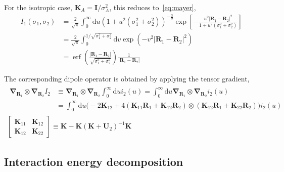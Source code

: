 For the isotropic case, $\mathbf K_A=\mathbf I/\sigma_A^2$, this reduces to~\eqref{eq:mayer},
\begin{equation}
\begin{aligned}
I_1(\sigma_1,\sigma_2)&=\frac2{\sqrt\pi}\int_0^\infty\mathrm du\left(1+u^2(\sigma_1^2+\sigma_2^2)\right)^{-\frac32}\exp\left[-\frac{u^2\lvert\mathbf R_1-\mathbf R_2\rvert^2}{1+u^2(\sigma_1^2+\sigma_2^2)}\right] \\
&=\frac2{\sqrt\pi}\int_0^{1/\sqrt{\sigma_1^2+\sigma_2^2}}\mathrm dv\exp\left(-v^2\lvert\mathbf R_1-\mathbf R_2\rvert^2\right) \\
&=\operatorname{erf}\left(\frac{\lvert\mathbf R_1-\mathbf R_2\rvert}{\sqrt{\sigma_1^2+\sigma_2^2}}\right)\frac1{\lvert\mathbf R_1-\mathbf R_2\rvert}
\end{aligned}
\end{equation}

The corresponding dipole operator is obtained by applying the tensor gradient,
\begin{gather}
\begin{aligned}
  \boldsymbol\nabla_{\mathbf R_1}\otimes\boldsymbol\nabla_{\mathbf R_2}I_2&\equiv
  \boldsymbol\nabla_{\mathbf R_1}\otimes\boldsymbol\nabla_{\mathbf R_2}\int_0^\infty\mathrm du i_2(u)=
  \int_0^\infty\mathrm du\boldsymbol\nabla_{\mathbf R_1}\otimes\boldsymbol\nabla_{\mathbf R_2} i_2(u) \\
  &=\int_0^\infty\mathrm du\big(-2\mathbf K_{12}+4(\mathbf K_{11}\mathbf R_1+\mathbf K_{12}\mathbf R_2)\otimes(\mathbf K_{12}\mathbf R_1+\mathbf K_{22}\mathbf R_2)\big)i_2(u)
\end{aligned} \\
  \begin{bmatrix}\mathbf K_{11}&\mathbf K_{12}\\\mathbf K_{12}&\mathbf K_{22}\end{bmatrix}\equiv\mathbf K-\mathbf K(\mathbf K+\mathbf U_2)^{-1}\mathbf K
\end{gather}

\subsection{Interaction energy decomposition}\label{sec:decom}

